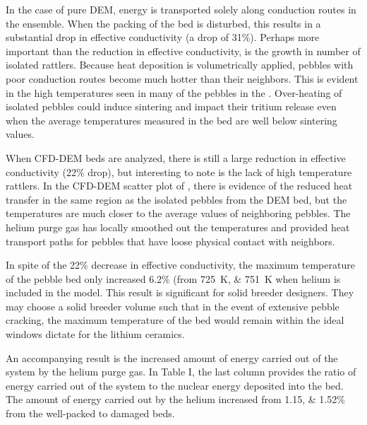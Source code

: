 In the case of pure DEM, energy is transported solely along conduction routes in the ensemble. When the packing of the bed is disturbed, this results in a substantial drop in effective conductivity (a drop of 31\%). Perhaps more important than the reduction in effective conductivity, is the growth in number of isolated rattlers. Because heat deposition is volumetrically applied, pebbles with poor conduction routes become much hotter than their neighbors. This is evident in the high temperatures seen in many of the pebbles in the . Over-heating of isolated pebbles could induce sintering and impact their tritium release even when the average temperatures measured in the bed are well below sintering values.

When CFD-DEM beds are analyzed, there is still a large reduction in effective conductivity (22\% drop), but interesting to note is the lack of high temperature rattlers. In the CFD-DEM scatter plot of , there is evidence of the reduced heat transfer in the same region as the isolated pebbles from the DEM bed, but the temperatures are much closer to the average values of neighboring pebbles. The helium purge gas has locally smoothed out the temperatures and provided heat transport paths for pebbles that have loose physical contact with neighbors.

In spite of the 22\% decrease in effective conductivity, the maximum temperature of the pebble bed only increased 6.2\% (from \SIlist{725;751}{\kelvin} when helium is included in the model. This result is significant for solid breeder designers. They may choose a solid breeder volume such that in the event of extensive pebble cracking, the maximum temperature of the bed would remain within the ideal windows dictate for the lithium ceramics.

An accompanying result is the increased amount of energy carried out of the system by the helium purge gas. In Table I, the last column provides the ratio of energy carried out of the system to the nuclear energy deposited into the bed. The amount of energy carried out by the helium increased from \numlist{1.15;1.52}\% from the well-packed to damaged beds.

